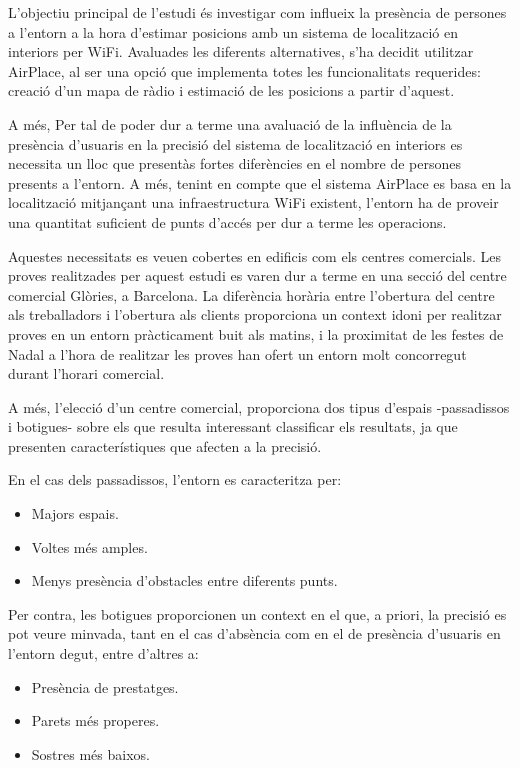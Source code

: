 
L'objectiu principal de l'estudi és investigar com influeix la presència de persones a l'entorn a la hora d'estimar posicions amb un sistema de localització en interiors per WiFi. Avaluades les diferents alternatives, s'ha decidit utilitzar AirPlace, al ser una opció que implementa totes les funcionalitats requerides: creació d'un mapa de ràdio i estimació de les posicions a partir d'aquest.

A més, Per tal de poder dur a terme una avaluació de la influència de la presència d'usuaris en la precisió del sistema de localització en interiors es necessita un lloc que presentàs fortes diferències en el nombre de persones presents a l'entorn. A més, tenint en compte que el sistema AirPlace es basa en la localització mitjançant una infraestructura WiFi existent, l'entorn ha de proveir una quantitat suficient de punts d'accés per dur a terme les operacions.

Aquestes necessitats es veuen cobertes en edificis com els centres comercials. Les proves realitzades per aquest estudi es varen dur a terme en una secció del centre comercial Glòries, a Barcelona. La diferència horària entre l'obertura del centre als treballadors i l'obertura als clients proporciona un context idoni per realitzar proves en un entorn pràcticament buit als matins, i la proximitat de les festes de Nadal a l'hora de realitzar les proves han ofert un entorn molt concorregut durant l'horari comercial.

A més, l'elecció d'un centre comercial, proporciona dos tipus d'espais -passadissos i botigues- sobre els que resulta interessant classificar els resultats, ja que presenten característiques que afecten a la precisió.

En el cas dels passadissos, l'entorn es caracteritza per:

\begin{itemize}
    \item Majors espais.
    \item Voltes més amples.
    \item Menys presència d'obstacles entre diferents punts.
\end{itemize}

Per contra, les botigues proporcionen un context en el que, a priori, la precisió es pot veure minvada, tant en el cas d'absència com en el de presència d'usuaris en l'entorn degut, entre d'altres a:

\begin{itemize}
    \item Presència de prestatges.
    \item Parets més properes.
    \item Sostres més baixos.
\end{itemize}

